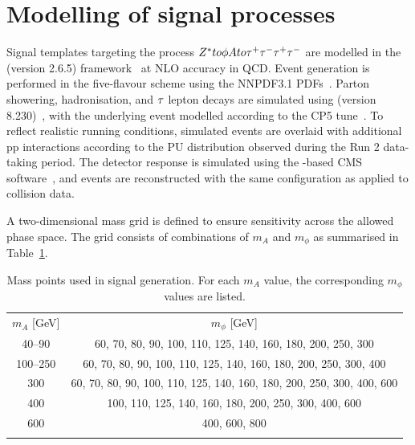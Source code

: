 \section{Modelling of signal processes}
\label{Section:Chapter6_SignalModelling}

Signal templates targeting the process $Z^* to \phi A to \tau^+\tau^-\tau^+\tau^-$ are modelled in the \MCATNLO (version 2.6.5) framework~\cite{MadGraph,FxFx} at NLO accuracy in QCD. Event generation is performed in the five-flavour scheme using the NNPDF3.1 PDFs~\cite{NNPDF}. Parton showering, hadronisation, and $\tau$ lepton decays are simulated using \PYTHIA (version 8.230)~\cite{PYTHIA}, with the underlying event modelled according to the CP5 tune~\cite{CP5_Tune}. To reflect realistic running conditions, simulated events are overlaid with additional pp interactions according to the PU distribution observed during the Run 2 data-taking period. The detector response is simulated using the \GEANTfour-based CMS software~\cite{GEANT4}, and events are reconstructed with the same configuration as applied to collision data.

A two-dimensional mass grid is defined to ensure sensitivity across the allowed phase space. The grid consists of combinations of $m_A$ and $m_\phi$ as summarised in Table~\ref{Table:Chapter6_4tauMassGrid}.

\begin{table}[!htbp]
\centering
\renewcommand{\arraystretch}{1.5} %
\setlength{\tabcolsep}{12pt} %
\begin{tabular}{cc}
\hline
$m_A$ [GeV] & $m_\phi$ [GeV] \\
\arrayrulecolor{black} \hline

40--90     & 60, 70, 80, 90, 100, 110, 125, 140, 160, 180, 200, 250, 300 \\
\arrayrulecolor{lightgray} \hline

100--250   & 60, 70, 80, 90, 100, 110, 125, 140, 160, 180, 200, 250, 300, 400 \\
\arrayrulecolor{lightgray} \hline

300        & 60, 70, 80, 90, 100, 110, 125, 140, 160, 180, 200, 250, 300, 400, 600 \\
\arrayrulecolor{lightgray} \hline

400        & 100, 110, 125, 140, 160, 180, 200, 250, 300, 400, 600 \\
\arrayrulecolor{lightgray} \hline

600        & 400, 600, 800 \\
\arrayrulecolor{black} \hline

\end{tabular}
\caption{Mass points used in signal generation. For each $m_A$ value, the corresponding $m_\phi$ values are listed.}
\label{Table:Chapter6_4tauMassGrid}
\end{table}

